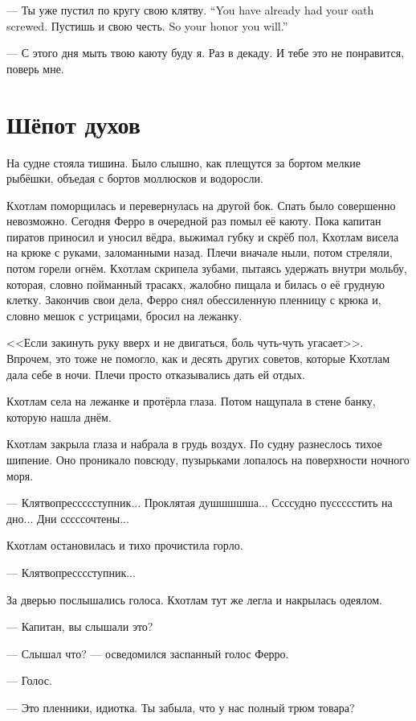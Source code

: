 {--- Ты уже пустил по кругу свою клятву.}
{``You have already had your oath screwed.}
{Пустишь и свою честь.}
{So your honor you will.''}

--- С этого дня мыть твою каюту буду я.
Раз в декаду.
И тебе это не понравится, поверь мне.

\section{Шёпот духов}

На судне стояла тишина.
Было слышно, как плещутся за бортом мелкие рыбёшки, объедая с бортов моллюсков и водоросли.

Кхотлам поморщилась и перевернулась на другой бок.
Спать было совершенно невозможно.
Сегодня Ферро в очередной раз помыл её каюту.
Пока капитан пиратов приносил и уносил вёдра, выжимал губку и скрёб пол, Кхотлам висела на крюке с руками, заломанными назад.
Плечи вначале ныли, потом стреляли, потом горели огнём.
Кхотлам скрипела зубами, пытаясь удержать внутри мольбу, которая, словно пойманный трасакх, жалобно пищала и билась о её грудную клетку.
Закончив свои дела, Ферро снял обессиленную пленницу с крюка и, словно мешок с устрицами, бросил на лежанку.

<<Если закинуть руку вверх и не двигаться, боль чуть-чуть угасает>>.
Впрочем, это тоже не помогло, как и десять других советов, которые Кхотлам дала себе в ночи.
Плечи просто отказывались дать ей отдых.

Кхотлам села на лежанке и протёрла глаза.
Потом нащупала в стене банку, которую нашла днём.

Кхотлам закрыла глаза и набрала в грудь воздух.
По судну разнеслось тихое шипение.
Оно проникало повсюду, пузырьками лопалось на поверхности ночного моря.

--- Клятвопрессссступник...
Проклятая душшшшша...
Ссссудно пуссссстить на дно...
Дни сссссочтены...

Кхотлам остановилась и тихо прочистила горло.

--- Клятвопресссступник...

За дверью послышались голоса.
Кхотлам тут же легла и накрылась одеялом.

--- Капитан, вы слышали это?

--- Слышал что? --- осведомился заспанный голос Ферро.

--- Голос.

--- Это пленники, идиотка.
Ты забыла, что у нас полный трюм товара?

